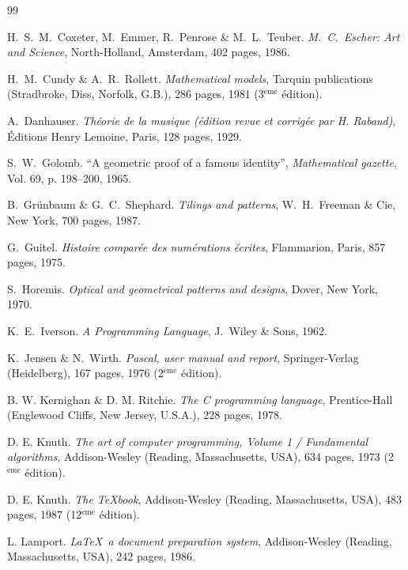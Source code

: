 \begin{thebibliography}{99}

 H.~S.~M.~Coxeter, M.~Emmer, R.~Penrose \& M.~L.~Teuber.
{\em M.~C.~Escher: Art and Science}, North-Holland, Amsterdam, 
402 pages, 1986.

 H.~M.~Cundy \& A.~R.~Rollett.
{\em Mathematical models}, Tarquin publications (Stradbroke, Diss, Norfolk, G.B.), 
286 pages, 1981 (3$^{\mathrm{\grave{e}me}}$ édition).

 A.~Danhauser.
{\em Théorie de la musique (édition revue et corrigée par H. Rabaud)}, 
Éditions Henry Lemoine, Paris, 128  pages, 1929.

 S.~W.~Golomb.
``A geometric proof of a famous identity'', 
{\em Mathematical gazette}, Vol. 69, p. 198--200, 1965.

 B.~Grünbaum \& G.~C.~Shephard.
{\em Tilings and patterns}, W.~H.~Freeman \& Cie, New York, 700 pages, 1987.

 G.~Guitel.
{\em Histoire comparée des numérations écrites}, 
Flammarion, Paris, 857 pages, 1975.

 S.~Horemis.
{\em Optical and geometrical patterns and designs}, Dover, New York, 1970.

 K.~E.~Iverson.
{\em A Programming Language}, J.~Wiley \& Sons, 1962.

 K.~Jensen \& N.~Wirth.
{\em Pascal, user manual and report}, Springer-Verlag (Heidelberg), 
167 pages, 1976 (2$^{\mathrm{\grave{e}me}}$ édition).

 B. W. Kernighan \& D. M. Ritchie.
{\em The C programming language}, Prentice-Hall (Englewood Cliffs, New Jersey, U.S.A.),
228 pages, 1978.

 D. E. Knuth.
{\em The art of computer programming, Volume 1 / Fundamental algorithms}, 
Addison-Wesley (Reading, Massachusetts, USA), 
634 pages, 1973 (2$^{\mathrm{\grave{e}me}}$ édition).

 D. E. Knuth.
{\em The \TeX book}, Addison-Wesley (Reading, Massachusetts, USA), 
483 pages, 1987 (12$^{\mathrm{\grave{e}me}}$ édition).

 L. Lamport.
{\em \LaTeX\ a document preparation system}, Addison-Wesley (Reading, Massachusetts, USA), 
242 pages, 1986.


\end{thebibliography}
